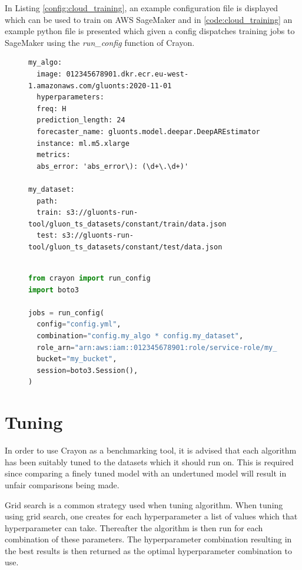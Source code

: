 In Listing \ref{config:cloud_training}, an example configuration file is displayed which can be used to train on AWS SageMaker and in \ref{code:cloud_training} an example python file is presented which given a config dispatches training jobs to SageMaker using the \textit{run\_config} function of Crayon.

\begin{figure}[h]
  \begin{lstlisting}[label={config:cloud_training}, caption={Config file for running training jobs on SageMaker.}]
my_algo:
  image: 012345678901.dkr.ecr.eu-west-1.amazonaws.com/gluonts:2020-11-01
  hyperparameters:
  freq: H
  prediction_length: 24
  forecaster_name: gluonts.model.deepar.DeepAREstimator 
  instance: ml.m5.xlarge 
  metrics:
  abs_error: 'abs_error\): (\d+\.\d+)'

my_dataset:
  path:
  train: s3://gluonts-run-tool/gluon_ts_datasets/constant/train/data.json
  test: s3://gluonts-run-tool/gluon_ts_datasets/constant/test/data.json
      
  \end{lstlisting}
  \begin{lstlisting}[language=Python, label={code:cloud_training}, caption={Code for running training jobs on AWS SageMaker using Crayon}]
from crayon import run_config
import boto3

jobs = run_config(
  config="config.yml",
  combination="config.my_algo * config.my_dataset",
  role_arn="arn:aws:iam::012345678901:role/service-role/my_role",
  bucket="my_bucket",
  session=boto3.Session(),
)
    \end{lstlisting}

\end{figure}

\section{Tuning}
In order to use Crayon as a benchmarking tool, it is advised that each algorithm has been suitably tuned to the datasets which it should run on. This is required since comparing a finely tuned model with an undertuned model will result in unfair comparisons being made.

Grid search is a common strategy used when tuning algorithm. When tuning using grid search, one creates for each hyperparameter a list of values which that hyperparameter can take. Thereafter the algorithm is then run for each combination of these parameters. The hyperparameter combination resulting in the best results is then returned as the optimal hyperparameter combination to use.

